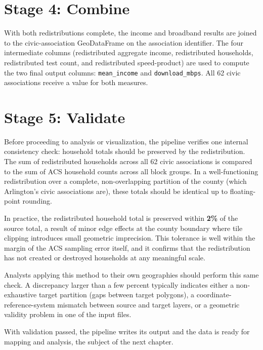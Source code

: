 \documentclass[
  letterpaper,
  DIV=11,
  numbers=noendperiod]{scrreprt}
\begin{document}
\section{Stage 4: Combine}\label{stage-4-combine}

With both redistributions complete, the income and broadband results are
joined to the civic-association GeoDataFrame on the association
identifier. The four intermediate columns (redistributed aggregate
income, redistributed households, redistributed test count, and
redistributed speed-product) are used to compute the two final output
columns: \texttt{mean\_income} and \texttt{download\_mbps}. All 62 civic
associations receive a value for both measures.

\section{Stage 5: Validate}\label{stage-5-validate}

Before proceeding to analysis or visualization, the pipeline verifies
one internal consistency check: household totals should be preserved by
the redistribution. The sum of redistributed households across all 62
civic associations is compared to the sum of ACS household counts across
all block groups. In a well-functioning redistribution over a complete,
non-overlapping partition of the county (which Arlington's civic
associations are), these totals should be identical up to floating-point
rounding.

In practice, the redistributed household total is preserved within
\textbf{2\%} of the source total, a result of minor edge effects at the
county boundary where tile clipping introduces small geometric
imprecision. This tolerance is well within the margin of the ACS
sampling error itself, and it confirms that the redistribution has not
created or destroyed households at any meaningful scale.

Analysts applying this method to their own geographies should perform
this same check. A discrepancy larger than a few percent typically
indicates either a non-exhaustive target partition (gaps between target
polygons), a coordinate-reference-system mismatch between source and
target layers, or a geometric validity problem in one of the input
files.

With validation passed, the pipeline writes its output and the data is
ready for mapping and analysis, the subject of the next chapter.

\end{document}
